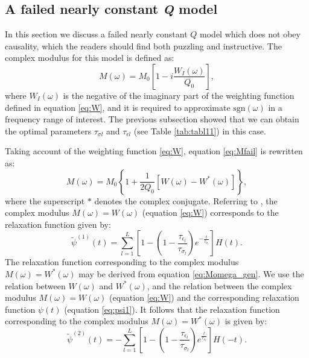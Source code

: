 \documentclass[article]{./macros/elsarticle_qh}
\begin{document}
\subsection{A failed nearly constant \textit{Q} model}
In this section we discuss a failed nearly constant $Q$ model which does not obey causality, which the readers should find both puzzling and instructive. The complex modulus for this model is defined as:
\begin{equation} \label{eq:Mfail}
M(\omega) = M_{0} \left[
1 - i \frac{W_{I}(\omega)}{Q_{0}}  
\right],
\end{equation} 
where $W_{I}(\omega)$ is the negative of the imaginary part of the weighting function defined in equation \ref{eq:W}, and it is required to approximate $\text{sgn}(\omega)$ in a frequency range of interest. The previous subsection showed that we can obtain the optimal parameters $\tau_{\sigma l}$ and $\tau_{\epsilon l}$ (see Table \ref{tab:tabl11}) in this case.  

Taking account of the weighting function \ref{eq:W}, equation \ref{eq:Mfail} is rewritten as:
\begin{equation} \label{eq:Mfail2}
M(\omega) = M_{0} \left \{
1 + \frac{1}{2Q_{0}}\left[ W(\omega) - W^{*}(\omega) 
\right]
\right \} ,
\end{equation}
where the superscript $*$ denotes the complex conjugate. Referring to \cite{hao.greenhalgh:2019}, the complex modulus $M(\omega) = W(\omega)$ (equation \ref{eq:W}) corresponds to the relaxation function given by:
\begin{equation} \label{eq:psi1}
\tilde{\psi}^{(1)}(t) = \sum_{l=1}^{L} 
\left[
1 - \left(1 - 
\frac{\tau_{\epsilon_l}}{\tau_{\sigma_l}} 
\right)
e^{-\frac{t}{\tau_{\sigma_l}}}
\right] H(t) .
\end{equation}
The relaxation function corresponding to the complex modulus $M(\omega) = W^{*}(\omega)$ may be derived from equation \ref{eq:Momega_gen}. We use the relation between $W(\omega)$ and $W^{*}(\omega)$, and the relation between the complex modulus $M(\omega) = W(\omega)$ (equation \ref{eq:W}) and the corresponding relaxation function $\psi(t)$ (equation \ref{eq:psi1}). It follows that the relaxation function corresponding to the complex modulus $M(\omega) = W^{*}(\omega)$ is given by:
\begin{equation} \label{eq:psi2}
\tilde{\psi}^{(2)}(t) = -\sum_{l=1}^{L}  
\left[
1 - \left(1 - 
\frac{\tau_{\epsilon_l}}{\tau_{\sigma_l}} 
\right)
e^{\frac{t}{\tau_{\sigma_l}}}
\right] H(-t) .
\end{equation}
\end{document}
